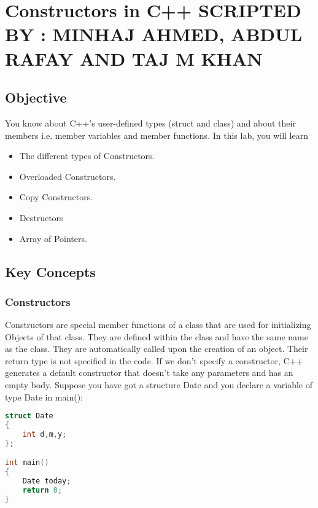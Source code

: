 \documentclass[11pt,fleqn]{book} %
\begin{document}
\newpage

\chapter{Constructors in C++ \hspace{36mm} {\textsc{\small SCRIPTED BY : MINHAJ AHMED, ABDUL RAFAY AND TAJ M KHAN}}}

\section{Objective}

You know about C++'s user-defined types (struct and class) and about their members i.e. member variables and member functions. In this lab, you will learn

\begin{itemize}
	\item The different types of Constructors.
	\item Overloaded Constructors.
	\item Copy Constructors.
	\item Destructors
	\item Array of Pointers.
\end{itemize}


\section{Key Concepts}

\subsection{Constructors}

Constructors are special member functions of a class that are used for initializing Objects of that class. They are defined within the class and have the same name as the class. They are automatically called upon the creation of an object. Their return type is not specified in the code. If we don't specify a constructor, C++ generates a default constructor that doesn't take any parameters and has an empty body. Suppose you have got a structure Date and you declare a variable of type Date in main():

\begin{lstlisting}[language=C++, caption = Uninitialized members]
struct Date 
{
	int d,m,y;
};

int main() 
{
	Date today;
	return 0;
}
\end{lstlisting}
\end{document}
